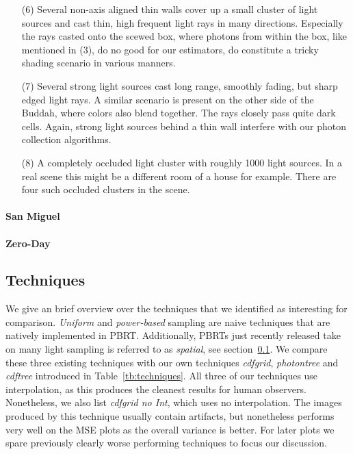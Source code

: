 \begin{itemize}
    \item[(6)] Several non-axis aligned thin walls cover up a small cluster of light sources and cast thin, high frequent light rays in many directions. Especially the rays casted onto the scewed box, where photons from within the box, like mentioned in (3), do no good for our estimators, do constitute a tricky shading scenario in various manners.
    \item[(7)] Several strong light sources cast long range, smoothly fading, but sharp edged light rays. A similar scenario is present on the other side of the Buddah, where colors also blend together. The rays closely pass quite dark cells. Again, strong light sources behind a thin wall interfere with our photon collection algorithms.
    \item[(8)] A completely occluded light cluster with roughly 1000 light sources. In a real scene this might be a different room of a house for example. There are four such occluded clusters in the scene.
\label{li:stanfordmuseum}
\end{itemize}
\paragraph{San Miguel}
\textcite{Sanmiguel}



\paragraph{Zero-Day}

\parencite{Beeple}




\subsection{Techniques}

We give an brief overview over the techniques that we identified as interesting for comparison. \textit{Uniform} and \textit{power-based} sampling are naive techniques that are natively implemented in PBRT. Additionally, PBRTs just recently released take on many light sampling is referred to as \textit{spatial}, see section~\ref{}. We compare these three existing techniques with our own techniques \textit{cdfgrid}, \textit{photontree} and \textit{cdftree} introduced in Table~\ref{tb:techniques}. All three of our techniques use interpolation, as this produces the cleanest results for human observers. Nonetheless, we also list \textit{cdfgrid no Int}, which uses no interpolation. The images produced by this technique usually contain artifacts, but nonetheless performs very well on the MSE plots as the overall variance is better. For later plots we spare previously clearly worse performing techniques to focus our discussion.

